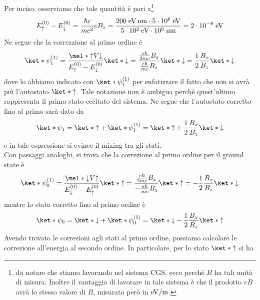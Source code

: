 \begin{soluzione}
   Per inciso, osserviamo che tale quantità è pari a\footnote{\E da notare che stiamo lavorando nel sistema CGS, ecco perché $B$ ha tali unità di misura. Inoltre il vantaggio di lavorare in tale sistema è che il prodotto $e B$ avrà lo stesso valore di $B$, misurato però in $\rm eV/m$.}
   \begin{equation*}
      E_{\uparrow}^{(0)} - E_{\downarrow}^{(0)}
      =\frac{\hbar c}{m c^2} e B_z
      =\rm \frac{200 \; eV \, nm \cdot 5 \cdot 10^6 \; eV}{5 \cdot 10^2 \; eV \cdot 10^9 \; nm}
      =2 \cdot 10^{-6} \; eV
   \end{equation*}
   Ne segue che la correzzione al primo ordine è
   \begin{equation*}
      \ket*{\psi_1^{(1)}}
      =\frac{\mel*{\uparrow}{V}{\downarrow}}{E_{\uparrow}^{(0)} - E_{\downarrow}^{(0)}} \ket*{\downarrow}
      =\frac{\frac{e \hbar}{2 m c} B_x}{\frac{e \hbar}{m c} B_z} \ket*{\downarrow}
      =\frac{1}{2} \frac{B_x}{B_z} \ket*{\downarrow}
   \end{equation*}
   dove lo abbiamo indicato con $\ket*{\psi_1^{(1)}}$ per enfatizzare il fatto che non si avrà più l'autostato $\ket*{\uparrow}$. Tale notazione non è ambigua perché quest'ultimo rappresenta il primo stato eccitato del sistema. Ne segue che l'autostato corretto fino al primo sarà dato da
   \begin{equation*}
      \ket*{\psi_1}
      =\ket*{\uparrow} + \ket*{\psi_1^{(1)}}
      =\ket*{\uparrow} + \frac{1}{2} \frac{B_x}{B_z} \ket*{\downarrow}
   \end{equation*}
   e in tale espressione si evince il mixing tra gli stati.\\
   Con passaggi analoghi, si trova che la correzione al primo ordine per il ground state è
   \begin{equation*}
      \ket*{\psi_0^{(1)}}
      =\frac{\mel*{\downarrow}{V}{\uparrow}}{E_{\downarrow}^{(0)} - E_{\uparrow}^{(0)}} \ket*{\uparrow}
      =\frac{\frac{e \hbar}{2 m c} B_x}{-\frac{e \hbar}{m c} B_z} \ket*{\uparrow}
      =-\frac{1}{2} \frac{B_x}{B_z} \ket*{\downarrow}
   \end{equation*}
   mentre lo stato corretto fino al primo ordine è
   \begin{equation*}
      \ket*{\psi_0}
      =\ket*{\downarrow} + \ket*{\psi_0^{(1)}}
      =\ket*{\downarrow} - \frac{1}{2} \frac{B_x}{B_z} \ket*{\uparrow}
   \end{equation*}
   Avendo trovato le correzioni agli stati al primo ordine, possiamo calcolare le correzione all'energia al secondo ordine. In particolare, per lo stato $\ket*{\uparrow}$ si ha

\end{soluzione}
